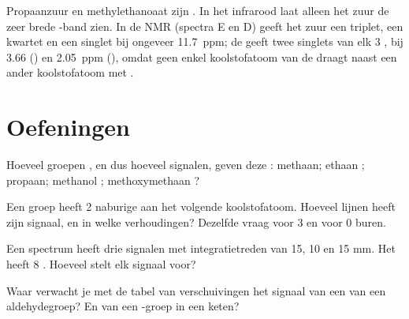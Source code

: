 \begin{example}\label{ex:g12:proton-nmr:isomers}
Propaanzuur  en methylethanoaat 
zijn . In het infrarood laat alleen het zuur de zeer brede
-band zien. In de NMR (spectra E en D) geeft het zuur een
triplet, een kwartet en een singlet bij ongeveer \qty{11.7}{ppm}; de 
geeft twee singlets van elk 3 ,
bij 3.66 () en \qty{2.05}{ppm} (), omdat geen enkel
koolstofatoom van de   draagt naast een ander koolstofatoom
met .
\end{example}

\section{Oefeningen}

\begin{exercise}[$\star$]\label{exo:g12:proton-nmr:1}
Hoeveel groepen , en dus hoeveel signalen, geven deze
: methaan; ethaan ; propaan; methanol
; methoxymethaan ?
\end{exercise}

\begin{exercise}[$\star$]\label{exo:g12:proton-nmr:2}
Een groep  heeft 2 naburige  aan het volgende
koolstofatoom. Hoeveel lijnen heeft zijn signaal, en in welke
verhoudingen? Dezelfde vraag voor 3 en voor 0 buren.
\end{exercise}

\begin{exercise}[$\star$]\label{exo:g12:proton-nmr:3}
Een spectrum heeft drie signalen met integratietreden van 15, 10 en
15 mm. Het  heeft 8 . Hoeveel  stelt elk signaal
voor?
\end{exercise}

\begin{exercise}[$\star$]\label{exo:g12:proton-nmr:4}
Waar verwacht je met de tabel van verschuivingen het signaal van een
 van een aldehydegroep? En van een -groep in een keten?
\end{exercise}

